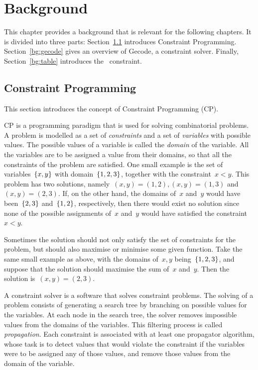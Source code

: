 \documentclass[a4paper,11pt]{article}
\newcommand{\Secref}[1]{Section~\ref{#1}}
\newcommand{\Table}{\Constraint{Table}~}
\begin{document}
\section{Background}
\label{bg}


This chapter provides a background that is relevant for the
following chapters. It is divided into three parts: \Secref{bg:cp}
introduces Constraint Programming. \Secref{bg:gecode} gives an overview
of Gecode, a constraint solver. Finally, \Secref{bg:table} introduces
the \Table constraint.

\subsection{Constraint Programming}
\label{bg:cp}
This section introduces the concept of Constraint Programming (CP).

CP is a programming paradigm that is used for solving
combinatorial problems. A problem is
modelled as a set of \emph{constraints} and a
set of \emph{variables} with possible values. The possible values of 
a variable is called the \emph{domain} of the variable.
All the variables are to be assigned a value
from their domains, so that all the constraints of the problem
are satisfied.
One small example is the set of variables~$\left\{x,y\right\}$ with
domain~$\left\{1,2,3\right\}$,
together with the constraint~$x<y$. This problem has two solutions, 
namely~$(x,y) = (1,2), (x,y) = (1,3)$ and~$(x,y) = (2,3)$.
If, on the other hand, the domains of~$x$ and~$y$ would have been~$\left\{2,3\right\}$
and~$\left\{1,2\right\}$, respectively, then there would exist no solution since none of
the possible assignments of~$x$ and~$y$ would have satisfied the constraint~$x<y$.

Sometimes the solution should not only satisfy the set of constraints for the
problem, but should also maximise or minimise some given function.
Take the same small example as above, with
the domains of~$x,y$ being~$\left\{1,2,3\right\}$, and suppose that the solution
should maximise the sum of~$x$ and~$y$. Then the solution is~$(x,y) = (2,3)$.

A constraint solver is a software that solves constraint problems.
The solving of a problem consists of generating a search tree by branching
on possible values for the variables. At each node in the search tree,
the solver removes impossible values from the domains of the variables.
This filtering process is called \emph{propagation}. Each constraint is
associated with at least one propagator algorithm, whose task is to detect
values that would violate the constraint if the variables were to be assigned
any of those values, and remove those values from the domain of the variable.
\end{document}
